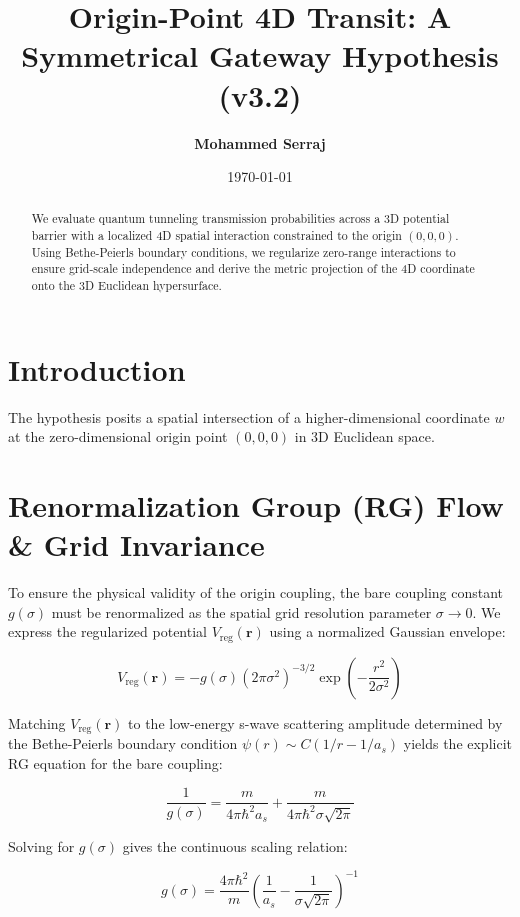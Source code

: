 \documentclass[11pt,a4paper]{article}
\title{\textbf{Origin-Point 4D Transit: A Symmetrical Gateway Hypothesis (v3.2)}}
\author{\textbf{Mohammed Serraj}}
\date{\today}
\begin{document}
\maketitle

\begin{abstract}
We evaluate quantum tunneling transmission probabilities across a 3D potential barrier with a localized 4D spatial interaction constrained to the origin $(0,0,0)$. Using Bethe-Peierls boundary conditions, we regularize zero-range interactions to ensure grid-scale independence and derive the metric projection of the 4D coordinate onto the 3D Euclidean hypersurface.
\end{abstract}

\section{Introduction}
The hypothesis posits a spatial intersection of a higher-dimensional coordinate $w$ at the zero-dimensional origin point $(0,0,0)$ in 3D Euclidean space.

\section{Renormalization Group (RG) Flow \& Grid Invariance}
To ensure the physical validity of the origin coupling, the bare coupling constant $g(\sigma)$ must be renormalized as the spatial grid resolution parameter $\sigma \to 0$. We express the regularized potential $V_{\text{reg}}(\mathbf{r})$ using a normalized Gaussian envelope:

\begin{equation}
V_{\text{reg}}(\mathbf{r}) = -g(\sigma) \left(2\pi \sigma^2\right)^{-3/2} \exp\left(-\frac{r^2}{2\sigma^2}\right)
\end{equation}

Matching $V_{\text{reg}}(\mathbf{r})$ to the low-energy s-wave scattering amplitude determined by the Bethe-Peierls boundary condition $\psi(r) \sim C(1/r - 1/a_s)$ yields the explicit RG equation for the bare coupling:

\begin{equation}
\frac{1}{g(\sigma)} = \frac{m}{4\pi \hbar^2 a_s} + \frac{m}{4\pi \hbar^2 \sigma \sqrt{2\pi}}
\end{equation}

Solving for $g(\sigma)$ gives the continuous scaling relation:

\begin{equation}
g(\sigma) = \frac{4\pi \hbar^2}{m} \left( \frac{1}{a_s} - \frac{1}{\sigma \sqrt{2\pi}} \right)^{-1}
\end{equation}
\end{document}
